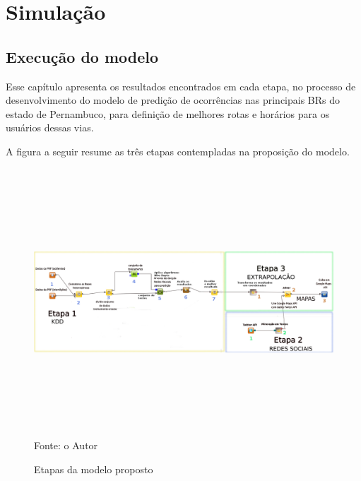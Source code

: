 \chapter{Simulação}\label{simula}

\section{Execução do modelo}

Esse capítulo apresenta os resultados encontrados em cada etapa, no processo de desenvolvimento do modelo de predição de ocorrências nas principais BRs do estado de Pernambuco, para definição de melhores rotas e horários para os usuários dessas vias.

\vspace{5mm}

A figura a seguir resume as três etapas contempladas na proposição do modelo.

\begin{figure}[ht]
\centering
\caption{Etapas da modelo proposto}
\includegraphics[width=165mm, height=100mm]{Figuras/Cronograma/metodologia.png}\\
\tiny Fonte: o Autor
\end{figure}

